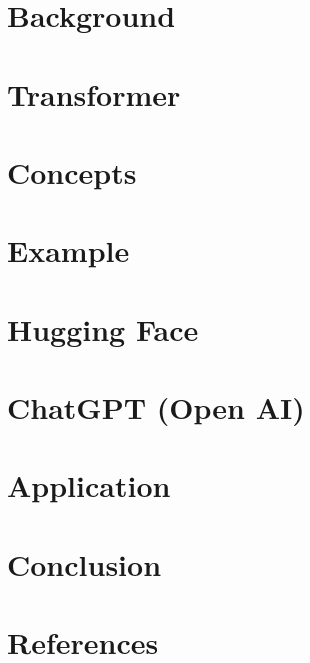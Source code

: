\section[Back]{Background}


\section[Trs]{Transformer}


\section[Concepts]{Concepts}


\section[Ex]{Example}


\section[HF]{Hugging Face}


\section[ChatGPT]{ChatGPT (Open AI)}


\section[Appln]{Application}


\section[Cncl]{Conclusion}


\section[Refs]{References}
